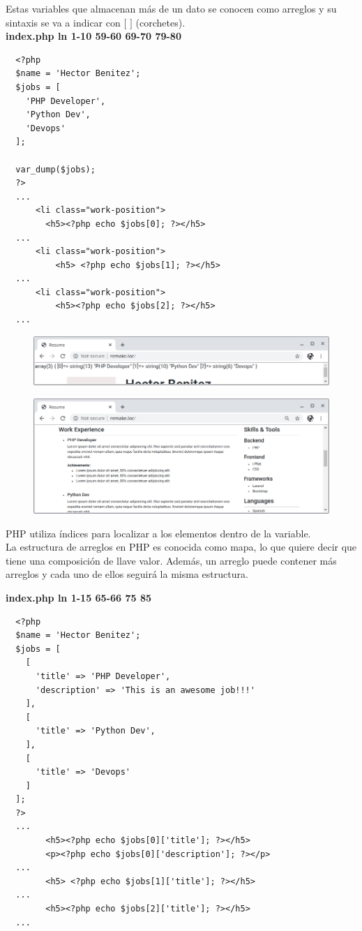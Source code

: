 \documentclass{article}
\begin{document}
Estas variables que almacenan más de un dato se conocen como arreglos y su
sintaxis se va a indicar con $[$  $]$ (corchetes).\\

\textbf{index.php ln 1-10 59-60 69-70 79-80}
\begin{verbatim}
  <?php
  $name = 'Hector Benitez';
  $jobs = [
    'PHP Developer',
    'Python Dev',
    'Devops'
  ];

  var_dump($jobs);
  ?>
  ...
      <li class="work-position">
        <h5><?php echo $jobs[0]; ?></h5>
  ...
      <li class="work-position">
          <h5> <?php echo $jobs[1]; ?></h5>
  ...
      <li class="work-position">
          <h5><?php echo $jobs[2]; ?></h5>
  ...
\end{verbatim}

\begin{figure}[h!]
  \centering
  \includegraphics[scale=0.5]{./Pictures/018_array.png}
\end{figure}

\begin{figure}[h!]
  \centering
  \includegraphics[scale=0.5]{./Pictures/019_array.png}
\end{figure}

PHP utiliza índices para localizar a los elementos dentro de la variable.\\

La estructura de arreglos en PHP es conocida como mapa, lo que quiere decir que
tiene una composición de llave valor. Además, un arreglo puede contener más
arreglos y cada uno de ellos seguirá la misma estructura.\\

\newpage

\textbf{index.php ln 1-15 65-66 75 85}
\begin{verbatim}
  <?php
  $name = 'Hector Benitez';
  $jobs = [
    [
      'title' => 'PHP Developer',
      'description' => 'This is an awesome job!!!'
    ],
    [
      'title' => 'Python Dev',
    ],
    [
      'title' => 'Devops'
    ]
  ];
  ?>
  ...
        <h5><?php echo $jobs[0]['title']; ?></h5>
        <p><?php echo $jobs[0]['description']; ?></p>
  ...
        <h5> <?php echo $jobs[1]['title']; ?></h5>
  ...
        <h5><?php echo $jobs[2]['title']; ?></h5>
  ...
\end{verbatim}
\end{document}
